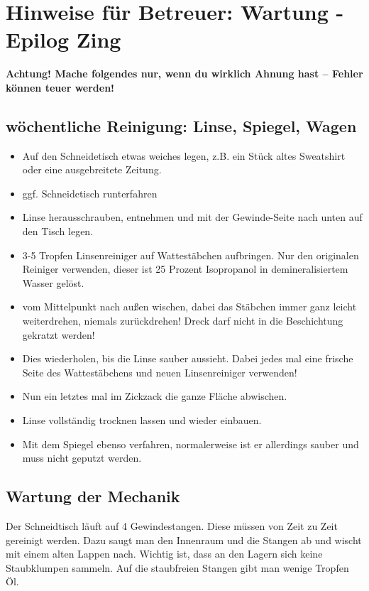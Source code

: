 \documentclass{\basedir/fablab-document}
\begin{document}
	\newpage
	\section{Hinweise für Betreuer: Wartung - Epilog Zing}

	\textbf{Achtung! Mache folgendes nur, wenn du wirklich Ahnung hast -- Fehler können teuer werden!}

	\subsection{wöchentliche Reinigung: Linse, Spiegel, Wagen}
	\begin{itemize}
		\label{linsenreinigung}
		\item Auf den Schneidetisch etwas weiches legen, z.B. ein Stück altes Sweatshirt oder eine ausgebreitete Zeitung.
		\item ggf. Schneidetisch runterfahren
		\item Linse herausschrauben, entnehmen und mit der Gewinde-Seite nach unten auf den Tisch legen.
		\item 3-5 Tropfen Linsenreiniger auf Wattestäbchen aufbringen. Nur den originalen Reiniger verwenden, dieser ist 25 Prozent Isopropanol in demineralisiertem Wasser gelöst.
		\item vom Mittelpunkt nach außen wischen, dabei das Stäbchen immer ganz leicht weiterdrehen, niemals zurückdrehen! Dreck darf nicht in die Beschichtung gekratzt werden!
		\item Dies wiederholen, bis die Linse sauber aussieht. Dabei jedes mal eine frische Seite des Wattestäbchens und neuen Linsenreiniger verwenden!
		\item Nun ein letztes mal im Zickzack die ganze Fläche abwischen.
		\item Linse vollständig trocknen lassen und wieder einbauen.
		\item Mit dem Spiegel ebenso verfahren, normalerweise ist er allerdings sauber und muss nicht geputzt werden.
	\end{itemize}

	\subsection{Wartung der Mechanik}
	Der Schneidtisch läuft auf 4 Gewindestangen. Diese müssen von Zeit zu Zeit gereinigt werden. Dazu saugt man den Innenraum und die Stangen ab und wischt mit einem alten Lappen nach. Wichtig ist, dass an den Lagern sich keine Staubklumpen sammeln. Auf die staubfreien Stangen gibt man wenige Tropfen Öl.
\end{document}
